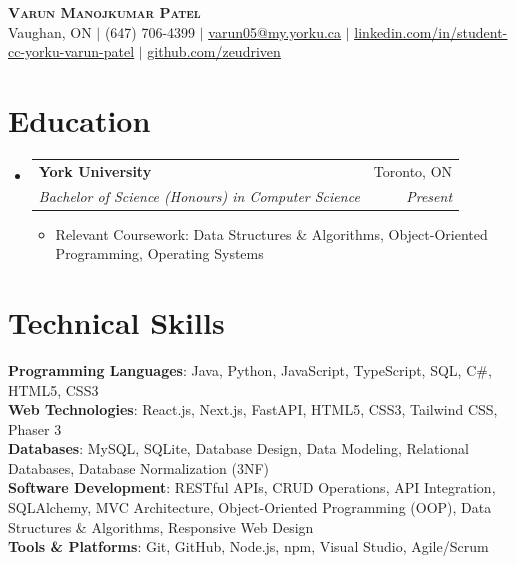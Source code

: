 \documentclass[letterpaper,11pt]{article}
\makeatletter
\newcommand{\resumeItem}[1]{
  \item\small{
    {#1 \vspace{-3pt}}
  }
}
\newcommand{\resumeSubheading}[4]{
  \vspace{-2pt}\item
    \begin{tabular*}{0.97\textwidth}[t]{l@{\extracolsep{\fill}}r}
      \textbf{#1} & #2 \\
      \textit{\small#3} & \textit{\small #4} \\
    \end{tabular*}\vspace{-7pt}
}
\newcommand{\resumeSubHeadingListStart}{\begin{itemize}[leftmargin=0.15in, label={}]}
\newcommand{\resumeSubHeadingListEnd}{\end{itemize}}
\newcommand{\resumeItemListStart}{\begin{itemize}[itemsep=0pt, topsep=1pt]}
\newcommand{\resumeItemListEnd}{\end{itemize}\vspace{-5pt}}
\makeatother
\begin{document}
\begin{center}
    \textbf{\Huge \scshape Varun Manojkumar Patel} \\ \vspace{1pt}
    \small Vaughan, ON $|$ (647) 706-4399 $|$
    \href{mailto:varun05@my.yorku.ca}{\underline{varun05@my.yorku.ca}} $|$
    \href{https://linkedin.com/in/student-cc-yorku-varun-patel}{\underline{linkedin.com/in/student-cc-yorku-varun-patel}} $|$
    \href{https://github.com/zeudriven}{\underline{github.com/zeudriven}}
\end{center}

\section{Education}
  \resumeSubHeadingListStart
    \resumeSubheading
      {York University}{Toronto, ON}
      {Bachelor of Science (Honours) in Computer Science}{Present}
      \resumeItemListStart
        \resumeItem{Relevant Coursework: Data Structures \& Algorithms, Object-Oriented Programming, Operating Systems}
      \resumeItemListEnd
  \resumeSubHeadingListEnd

\section{Technical Skills}
 \begin{itemize}[leftmargin=0.15in, label={}]
    \small{\item{
     \textbf{Programming Languages}{: Java, Python, JavaScript, TypeScript, SQL, C\#, HTML5, CSS3} \\
     \textbf{Web Technologies}{: React.js, Next.js, FastAPI, HTML5, CSS3, Tailwind CSS, Phaser 3} \\
     \textbf{Databases}{: MySQL, SQLite, Database Design, Data Modeling, Relational Databases, Database Normalization (3NF)} \\
     \textbf{Software Development}{: RESTful APIs, CRUD Operations, API Integration, SQLAlchemy, MVC Architecture, Object-Oriented Programming (OOP), Data Structures \& Algorithms, Responsive Web Design} \\
     \textbf{Tools \& Platforms}{: Git, GitHub, Node.js, npm, Visual Studio, Agile/Scrum}
    }}
 \end{itemize}
\end{document}
